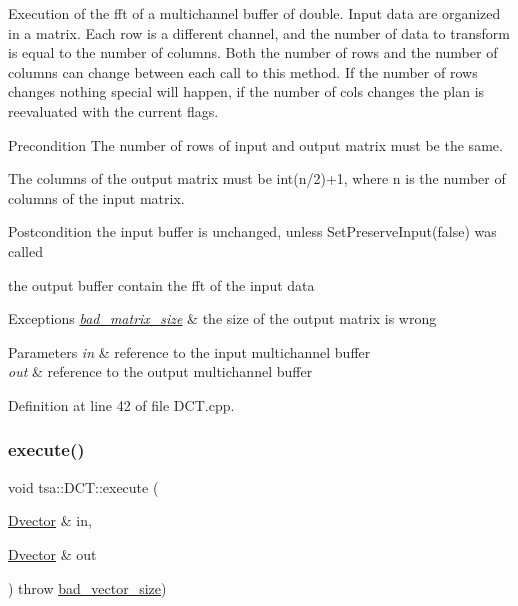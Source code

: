 Execution of the fft of a multichannel buffer of double. Input data are organized in a matrix. Each row is a different channel, and the number of data to transform is equal to the number of columns. Both the number of rows and the number of columns can change between each call to this method. If the number of rows changes nothing special will happen, if the number of cols changes the plan is reevaluated with the current flags.

\begin{DoxyPrecond}{Precondition}
The number of rows of input and output matrix must be the same. 

The columns of the output matrix must be int(n/2)+1, where n is the number of columns of the input matrix.
\end{DoxyPrecond}
\begin{DoxyPostcond}{Postcondition}
the input buffer is unchanged, unless Set\+Preserve\+Input(false) was called 

the output buffer contain the fft of the input data
\end{DoxyPostcond}

\begin{DoxyExceptions}{Exceptions}
{\em \hyperlink{classtsa_1_1bad__matrix__size}{bad\+\_\+matrix\+\_\+size}} & the size of the output matrix is wrong \\
\hline
\end{DoxyExceptions}

\begin{DoxyParams}{Parameters}
{\em in} & reference to the input multichannel buffer \\
\hline
{\em out} & reference to the output multichannel buffer \\
\hline
\end{DoxyParams}


Definition at line 42 of file D\+C\+T.\+cpp.

\mbox{\label{classtsa_1_1_d_c_t_adcdd78df5654afdc798748671a7b121d}} 
\subsubsection{\texorpdfstring{execute()}{execute()}\hspace{0.1cm}{\footnotesize\ttfamily [2/2]}}
{\footnotesize\ttfamily void tsa\+::\+D\+C\+T\+::execute (\begin{DoxyParamCaption}\item[{\hyperlink{namespacetsa_a8900fb03d849baf447a1a0efe2561fb2}{Dvector} \&}]{in,  }\item[{\hyperlink{namespacetsa_a8900fb03d849baf447a1a0efe2561fb2}{Dvector} \&}]{out }\end{DoxyParamCaption}) throw  \hyperlink{classtsa_1_1bad__vector__size}{bad\+\_\+vector\+\_\+size}) }

